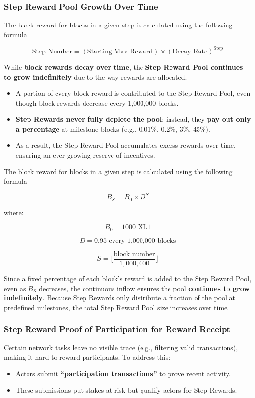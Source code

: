 \documentclass{article}
\begin{document}
\subsubsection{Step Reward Pool Growth Over Time}
The block reward for blocks in a given step is calculated using the following
formula:

\[
    \text{Step Number} = (\text{Starting Max Reward}) \times (\text{Decay Rate})^{\text{Step}}
\]

While \textbf{block rewards decay over time}, the \textbf{Step Reward Pool
    continues to grow indefinitely} due to the way rewards are allocated.

\begin{itemize}
    \item A portion of every block reward is contributed to the Step Reward Pool, even
          though block rewards decrease every 1,000,000 blocks.
    \item \textbf{Step Rewards never fully deplete the pool}; instead, they \textbf{pay out only a percentage} at milestone blocks (e.g., 0.01\%, 0.2\%, 3\%, 45\%).
    \item As a result, the Step Reward Pool accumulates excess rewards over time,
          ensuring an ever-growing reserve of incentives.
\end{itemize}

The block reward for blocks in a given step is calculated using the following
formula:

\[
    B_S = B_0 \times D^S
\]

where:

\[
    B_0 = 1000 \text{ XL1}
\]

\[
    D = 0.95 \text{ every 1,000,000 blocks}
\]

\[
    S = \lfloor \frac{\text{block number}}{1,000,000} \rfloor
\]

Since a fixed percentage of each block's reward is added to the Step Reward
Pool, even as \( B_S \) decreases, the continuous inflow ensures the pool
\textbf{continues to grow indefinitely}. Because Step Rewards only distribute a
fraction of the pool at predefined milestones, the total Step Reward Pool size
increases over time.

\subsubsection{Step Reward Proof of Participation for Reward Receipt}

Certain network tasks leave no visible trace (e.g., filtering valid
transactions), making it hard to reward participants. To address this:
\begin{itemize}
    \item Actors submit \textbf{“participation transactions”} to prove recent activity.
    \item These submissions put stakes at risk but qualify actors for Step Rewards.
\end{itemize}
\end{document}

